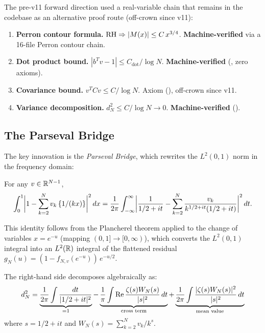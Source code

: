 \documentclass[11pt,a4paper]{article}
\begin{document}
The pre-v11 forward direction used a real-variable chain that remains
in the codebase as an alternative proof route (off-crown since v11):

\begin{enumerate}
  \item \textbf{Perron contour formula.} $\mathrm{RH} \Rightarrow |M(x)| \leq C\,x^{3/4}$.
    \textbf{Machine-verified} via a 16-file Perron contour chain.

  \item \textbf{Dot product bound.} $|b^Tv - 1| \leq C_{\mathrm{dot}} / \log N$.
    \textbf{Machine-verified} (, zero axioms).

  \item \textbf{Covariance bound.} $v^T C v \leq C / \log N$.
    Axiom (), off-crown since v11.

  \item \textbf{Variance decomposition.}
    $d_N^2 \leq C/\log N \to 0$.
    \textbf{Machine-verified} ().
\end{enumerate}

\subsection{The Parseval Bridge}

The key innovation is the \emph{Parseval Bridge}, which rewrites the
$L^2(0,1)$ norm in the frequency domain:

\begin{theorem}
\label{thm:parseval}
For any $v \in \mathbb{R}^{N-1}$,
\[
  \int_0^1 \biggl|1 - \sum_{k=2}^N v_k\,\{1/(kx)\}\biggr|^2\,dx
  = \frac{1}{2\pi} \int_{-\infty}^{\infty}
    \biggl|\frac{1}{1/2+it} - \sum_{k=2}^N \frac{v_k}{k^{1/2+it}(1/2+it)}\biggr|^2\,dt.
\]
\end{theorem}

This identity follows from the Plancherel theorem applied to the change
of variables $x = e^{-u}$ (mapping $(0,1] \to [0,\infty)$), which
converts the $L^2(0,1)$ integral into an $L^2(\mathbb{R})$ integral of the
flattened residual $g_N(u) = (1 - f_{N,v}(e^{-u}))\,e^{-u/2}$.

The right-hand side decomposes algebraically as:
\begin{equation}
\label{eq:three-term}
  d_N^2 = \underbrace{\frac{1}{2\pi}\int \frac{dt}{|1/2+it|^2}}_{= 1}
  - \underbrace{\frac{1}{\pi}\int \operatorname{Re}\frac{\zeta(s)W_N(s)}{|s|^2}\,dt}_{\text{cross term}}
  + \underbrace{\frac{1}{2\pi}\int \frac{|\zeta(s)W_N(s)|^2}{|s|^2}\,dt}_{\text{mean value}}
\end{equation}
where $s = 1/2 + it$ and $W_N(s) = \sum_{k=2}^N v_k / k^s$.
\end{document}
